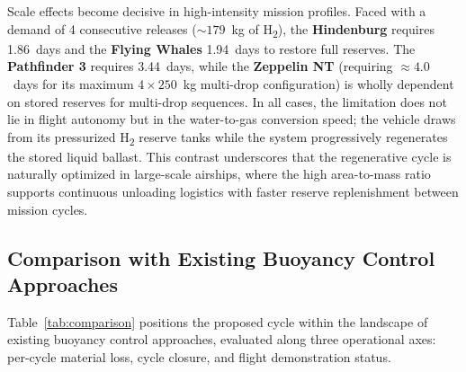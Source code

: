 \documentclass[applsci,article,submit,pdftex,moreauthors]{Definitions/mdpi}
\newcommand{\added}[1]{#1}
\begin{document}
Scale effects become decisive in high-intensity mission profiles. Faced with a demand of 4 consecutive releases (${\sim}179$~kg of H\textsubscript{2}), the \textbf{Hindenburg} requires 1.86~days and the \textbf{Flying Whales} 1.94~days to restore full reserves. The \textbf{Pathfinder 3} requires 3.44~days, while the \textbf{Zeppelin NT} (requiring ${\approx}4.0$~days for its maximum $4\times250$~kg multi-drop configuration) is wholly dependent on stored reserves for multi-drop sequences. In all cases, the limitation does not lie in flight autonomy but in the water-to-gas conversion speed; the vehicle draws from its pressurized H\textsubscript{2} reserve tanks while the system progressively regenerates the stored liquid ballast. This contrast underscores that the regenerative cycle is naturally optimized in large-scale airships, where the high area-to-mass ratio supports continuous unloading logistics with faster reserve replenishment between mission cycles.

\subsection{Comparison with Existing Buoyancy Control Approaches}
\added{Table~\ref{tab:comparison} positions the proposed cycle within the landscape of existing buoyancy control approaches, evaluated along three operational axes: per-cycle material loss, cycle closure, and flight demonstration status.}
\end{document}
